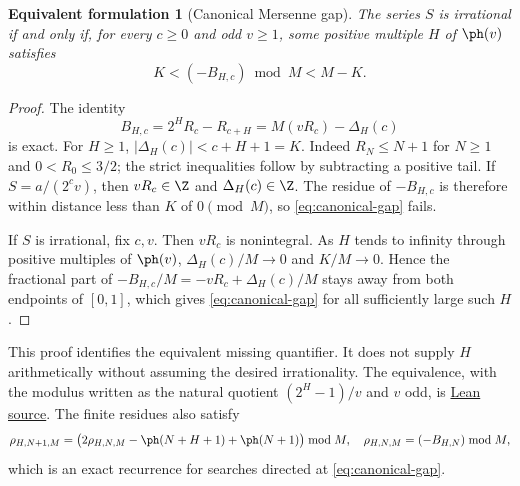 \documentclass[11pt]{article}
\newtheorem{equivform}[theorem]{Equivalent formulation}
\begin{document}
\begin{equivform}[Canonical Mersenne gap]\label{res:canonicalmersenne}
The series $S$ is irrational if and only if, for every $c\ge0$ and odd
$v\ge1$, some positive multiple $H$ of $\ph(v)$ satisfies
\begin{equation}\label{eq:canonical-gap}
 K<(-B_{H,c})\bmod M<M-K.
\end{equation}
\end{equivform}
\begin{proof}
The identity
\[
 B_{H,c}=2^HR_c-R_{c+H}=M(vR_c)-\Delta_H(c)
\]
is exact. For $H\ge1$, $|\Delta_H(c)|<c+H+1=K$. Indeed $R_N\le N+1$
for $N\ge1$ and $0<R_0\le3/2$; the strict inequalities follow by subtracting
a positive tail. If $S=a/(2^cv)$, then $vR_c\in\Z$ and
$\Delta_H(c)\in\Z$. The residue of $-B_{H,c}$ is therefore within distance
less than $K$ of $0\pmod M$, so \eqref{eq:canonical-gap} fails.

If $S$ is irrational, fix $c,v$. Then $vR_c$ is nonintegral. As $H$ tends
to infinity through positive multiples of $\ph(v)$,
$\Delta_H(c)/M\to0$ and $K/M\to0$. Hence the fractional part of
$-B_{H,c}/M=-vR_c+\Delta_H(c)/M$ stays away from both endpoints of $[0,1]$,
which gives \eqref{eq:canonical-gap} for all sufficiently large such $H$.
\end{proof}
This proof identifies the equivalent missing quantifier. It does not supply
$H$ arithmetically without assuming the desired irrationality. The
equivalence, with the modulus written as the natural quotient $(2^H-1)/v$
and $v$ odd, is
\href{https://github.com/wcook04/plectis-erdos/blob/f36a98bf3d3e6f65f1074e3b800e3293d5b8a51a/ErdosProblems/Erdos249/PaperCompleteR7/ArithmeticAssemblies.lean#L156}{Lean source}.
The finite residues also satisfy
\[
 \rho_{H,N+1,M}=
 \bigl(2\rho_{H,N,M}-\ph(N+H+1)+\ph(N+1)\bigr)\bmod M,
 \quad \rho_{H,N,M}=(-B_{H,N})\bmod M,
\]
which is an exact recurrence for searches directed at \eqref{eq:canonical-gap}.
\end{document}
